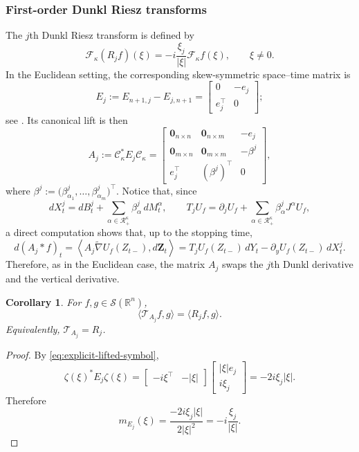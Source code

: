 \documentclass[11pt]{amsart}
\newtheorem{corollary}[theorem]{Corollary}
\theoremstyle{definition}
\theoremstyle{remark}
\numberwithin{equation}{section}
\newcommand{\R}{\mathbb{R}}
\newcommand{\RR}{\mathcal{R}}
\begin{document}
\subsubsection{First-order Dunkl Riesz transforms}

The $j$th Dunkl Riesz transform is defined by
\[
\mathcal F_\kappa(R_jf)(\xi)
=-i\frac{\xi_j}{|\xi|}\mathcal F_\kappa f(\xi),
\qquad \xi\neq0.
\]
In the Euclidean setting, the corresponding skew-symmetric space--time matrix is
\[
E_j:=E_{n+1,j}-E_{j,n+1}
=\begin{bmatrix}0&-e_j\\e_j^\top&0\end{bmatrix};
\]
see \cite{Ban1}. Its canonical lift is then
\begin{equation}
A_j:=\mathcal C_\kappa^*E_j\mathcal C_\kappa
=
\begin{bmatrix}
\mathbf0_{n\times n}&\mathbf0_{n\times m}&-e_j\\
\mathbf0_{m\times n}&\mathbf0_{m\times m}&-\beta^j\\
e_j^\top&(\beta^j)^\top&0
\end{bmatrix},
\end{equation}
where
$\beta^j:=\bigl(\beta_{\alpha_1}^j,\ldots,\beta_{\alpha_m}^j\bigr)^\top$.
Notice that, since
\[
dX_t^j=dB_t^j+\sum_{\alpha\in\RR_+^\kappa}\beta_\alpha^j\,dM_t^\alpha,
\qquad
T_jU_f=\partial_jU_f+\sum_{\alpha\in\RR_+^\kappa}\beta_\alpha^jJ^\alpha U_f,
\]
a direct computation shows that, up to the stopping time,
\[
d(A_j\ast f)_t
=\left\langle A_j\widetilde\nabla U_f(Z_{t-}),d\mathbf Z_t\right\rangle
=T_jU_f(Z_{t-})\,dY_t-\partial_yU_f(Z_{t-})\,dX_t^j.
\]
Therefore, as in the Euclidean case, the matrix $A_j$ swaps the $j$th Dunkl derivative and the vertical derivative.

\begin{corollary}
For $f,g\in\mathcal S(\R^n)$,
\[
\langle\mathcal T_{A_j}f,g\rangle=\langle R_jf,g\rangle.
\]
Equivalently, $\mathcal T_{A_j}=R_j$.
\end{corollary}

\begin{proof}
By \eqref{eq:explicit-lifted-symbol},
\[
\zeta(\xi)^*E_j\zeta(\xi)
=\begin{bmatrix}-i\xi^\top&-|\xi|\end{bmatrix}
\begin{bmatrix}|\xi|e_j\\i\xi_j\end{bmatrix}
=-2i\xi_j|\xi|.
\]
Therefore
\[
m_{E_j}(\xi)=\frac{-2i\xi_j|\xi|}{2|\xi|^2}
=-i\frac{\xi_j}{|\xi|}.
\]
\end{proof}
\end{document}
